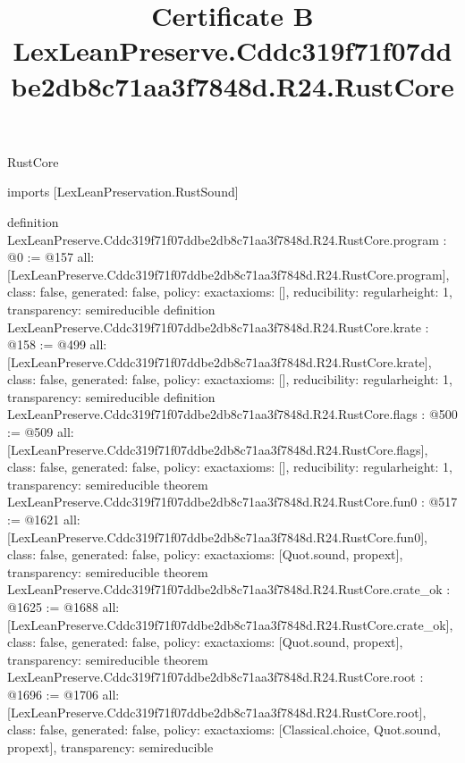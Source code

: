 \begin{lexlean}{RustCore}
\title{Certificate B LexLeanPreserve.Cddc319f71f07ddbe2db8c71aa3f7848d.R24.RustCore}
\begin{coremodule}
imports [LexLeanPreservation.RustSound]

definition LexLeanPreserve.Cddc319f71f07ddbe2db8c71aa3f7848d.R24.RustCore.program : @0 := @157 {
  all: [LexLeanPreserve.Cddc319f71f07ddbe2db8c71aa3f7848d.R24.RustCore.program],
  class: false,
  generated: false,
  policy: exact{axioms: []},
  reducibility: regular{height: 1},
  transparency: semireducible
}
definition LexLeanPreserve.Cddc319f71f07ddbe2db8c71aa3f7848d.R24.RustCore.krate : @158 := @499 {
  all: [LexLeanPreserve.Cddc319f71f07ddbe2db8c71aa3f7848d.R24.RustCore.krate],
  class: false,
  generated: false,
  policy: exact{axioms: []},
  reducibility: regular{height: 1},
  transparency: semireducible
}
definition LexLeanPreserve.Cddc319f71f07ddbe2db8c71aa3f7848d.R24.RustCore.flags : @500 := @509 {
  all: [LexLeanPreserve.Cddc319f71f07ddbe2db8c71aa3f7848d.R24.RustCore.flags],
  class: false,
  generated: false,
  policy: exact{axioms: []},
  reducibility: regular{height: 1},
  transparency: semireducible
}
theorem LexLeanPreserve.Cddc319f71f07ddbe2db8c71aa3f7848d.R24.RustCore.fun0 : @517 := @1621 {
  all: [LexLeanPreserve.Cddc319f71f07ddbe2db8c71aa3f7848d.R24.RustCore.fun0],
  class: false,
  generated: false,
  policy: exact{axioms: [Quot.sound, propext]},
  transparency: semireducible
}
theorem LexLeanPreserve.Cddc319f71f07ddbe2db8c71aa3f7848d.R24.RustCore.crate_ok : @1625 := @1688 {
  all: [LexLeanPreserve.Cddc319f71f07ddbe2db8c71aa3f7848d.R24.RustCore.crate_ok],
  class: false,
  generated: false,
  policy: exact{axioms: [Quot.sound, propext]},
  transparency: semireducible
}
theorem LexLeanPreserve.Cddc319f71f07ddbe2db8c71aa3f7848d.R24.RustCore.root : @1696 := @1706 {
  all: [LexLeanPreserve.Cddc319f71f07ddbe2db8c71aa3f7848d.R24.RustCore.root],
  class: false,
  generated: false,
  policy: exact{axioms: [Classical.choice, Quot.sound, propext]},
  transparency: semireducible
}


\end{coremodule}
\end{lexlean}
